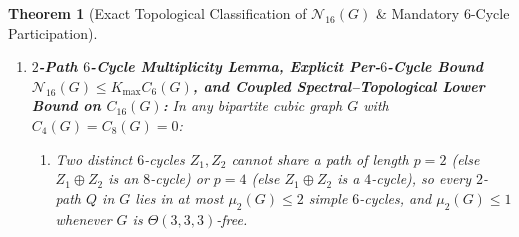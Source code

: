 \documentclass[10pt,a4paper]{article}
\newtheorem{theorem}{Theorem}[section]
\theoremstyle{definition}
\theoremstyle{remark}
\begin{document}
\begin{theorem}[Exact Topological Classification of $\mathcal{N}_{16}(G)$ \& Mandatory $6$-Cycle Participation]
\begin{enumerate}[label=(\alph*),nosep]
\begin{enumerate}[label=(\roman*),nosep]
    \item If $G$ is bipartite cubic with $C_4(G) = C_8(G) = 0$ (so simple cycles have even lengths in $\{6, 10, 12, 14, \dots\}$), then \textbf{$100\%$ of walks in $\mathcal{N}_{16}(G) = \mathcal{N}_{16}^{\mathrm{dumbbell}}(G) + \mathcal{N}_{16}^{\mathrm{theta}}(G)$ traverse at least one simple $6$-cycle}:
    \begin{itemize}[nosep]
      \item \textbf{Type I ($\mathrm{Db}(6,6;s=2)$ Dumbbell Walks):} Every walk in $\mathcal{N}_{16}^{\mathrm{dumbbell}}(G)$ has $b_1(H) = 2$, $|V(H)| = 13$, $|E(H)| = 14$, where $E_{\mathrm{odd}}(W) = Z_1 \sqcup Z_2$ consists of two vertex-disjoint $6$-cycles ($6 + 6 = 12$) joined by a length-$2$ bridge $E_{\mathrm{even}}(W) = P_2$ traversed twice ($12 + 2(2) = 16$; note $s = 1$ is excluded because a single round-trip across a length-$1$ bridge into a $6$-cycle takes $1 + 6 + 1 = 8$ steps and $6a + 8b = 16$ has no solution with $a, b \ge 1$).
      \item \textbf{Type II ($(6,10)$ Theta \& $6$-Cycle Prism Walks):} Every bridgeless walk with $b_1(H) = 2$ traverses a theta subgraph $\Theta(p, 6-p, 10-p)$ sharing a path $E_{\mathrm{even}}(W) = P_p$ of length $p \in \{1, 2, 3, 5\}$ ($p = 4$ is excluded because $16 - 2(4) = 8$ would form an $8$-cycle), corresponding to $\Theta(1, 5, 5)$ ($|V|=10, |E|=11$), $\Theta(3, 3, 7)$ ($|V|=12, |E|=13$), $\Theta(2, 4, 8)$ ($|V|=13, |E|=14$), and $\Theta(1, 5, 9)$ ($|V|=14, |E|=15$); any walk with $b_1(H) = 3$ occurs only when $G$ contains a $\Theta(3,3,3)$ subgraph or two vertex-disjoint $6$-cycles joined by two rungs ($|E_{\mathrm{odd}}(W)| \in \{6, 12\}$).
    \end{itemize}
  \end{enumerate}
  \item \textbf{$2$-Path $6$-Cycle Multiplicity Lemma, Explicit Per-$6$-Cycle Bound $\mathcal{N}_{16}(G) \le K_{\max} C_6(G)$, and Coupled Spectral--Topological Lower Bound on $C_{16}(G)$:}
  In any bipartite cubic graph $G$ with $C_4(G) = C_8(G) = 0$:
  \begin{enumerate}[label=(\roman*),nosep]
    \item Two distinct $6$-cycles $Z_1, Z_2$ cannot share a path of length $p = 2$ (else $Z_1 \oplus Z_2$ is an $8$-cycle) or $p = 4$ (else $Z_1 \oplus Z_2$ is a $4$-cycle), so every $2$-path $Q$ in $G$ lies in at most $\mu_2(G) \le 2$ simple $6$-cycles, and $\mu_2(G) \le 1$ whenever $G$ is $\Theta(3,3,3)$-free.

\end{enumerate}
\end{enumerate}
\end{theorem}
\end{document}
